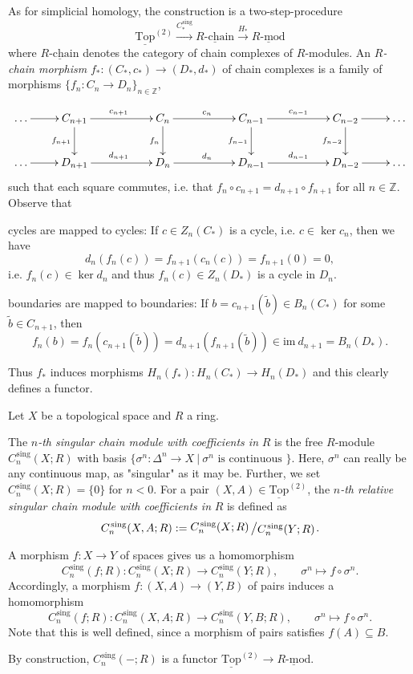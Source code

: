 \documentclass[11pt]{book}
\numberwithin{dummy}{section}
\theoremstyle{nonumberbreak}
\newenvironment{defin}[1][]{\ifthenelse{\equal{#1}{}}{\definition}{\definition[#1]}\rm}{\enddefinition}
\newcommand{\Rmod}{\underline{R\textrm{-}\mathrm{mod}}}
\newcommand{\toptwo}{\underline{\mathrm{Top}}^{(2)}}
\newcommand{\Rchain}{\underline{R\textrm{-}\mathrm{chain}}}
\newcommand{\la}{\longrightarrow}
\newcommand{\Z}{\mathbb{Z}}
\newcommand{\Cs}{C^{\hspace{1pt}\mathrm{sing}}}
\newcommand{\slant}[2]{{\raisebox{.1em}{$#1$}\left/\raisebox{-.1em}{$#2$}\right.}}
\begin{document}
\begin{spacing}{1.4}
\thispagestyle{empty}



As for simplicial homology, the construction is a two-step-procedure
$$\toptwo \xrightarrow{\Cs_{*}} \Rchain \overset{H_*}{\la} \Rmod$$
where $\Rchain$ denotes the category of chain complexes of $R$-modules. An $R$\textit{-chain morphism} \linebreak ${f_*: (C_*, c_*) \la (D_*, d_*)}$ of chain complexes is a family of morphisms $\{f_n: C_n \la D_n\}_{n \in \Z}$,

$$
\begin{xy}
\xymatrix{
\ldots \ar[r] & C_{n+1} \ar[d]_{f_{n+1}} \ar[rr]^{c_{n+1}} && C_n \ar[d]_{f_n} \ar[rr]^{c_n} && C_{n-1} \ar[d]_{f_{n-1}} \ar[rr]^{c_{n-1}} && C_{n-2} \ar[d]_{f_{n-2}} \ar[r] & \ldots \\
\ldots \ar[r] & D_{n+1} \ar[rr]^{d_{n+1}} && D_n \ar[rr]^{d_n} && D_{n-1} \ar[rr]^{d_{n-1}} && D_{n-2} \ar[r] & \ldots
}
\end{xy}
$$
such that each square commutes, i.e. that $f_n \circ c_{n+1} = d_{n+1} \circ f_{n+1}$ for all $n \in \Z$. Observe that
\begin{compactenum}
\item cycles are mapped to cycles: If $c \in Z_n(C_*)$ is a cycle, i.e. $c \in \ker c_n$, then we have
$$d_n(f_n(c)) = f_{n+1}(c_n(c)) = f_{n+1}(0) = 0,$$
i.e. $f_n(c) \in \ker d_n$ and thus $f_n(c) \in Z_n(D_*)$ is a cycle in $D_n$.
\item boundaries are mapped to boundaries: If $b= c_{n+1}(\tilde{b}) \in B_n(C_*)$ for some $\tilde{b} \in C_{n+1}$, then 
$$f_n(b) = f_n(c_{n+1}(\tilde{b})) = d_{n+1}(f_{n+1}(\tilde{b})) \in \mathrm{im} \ d_{n+1} = B_n(D_*).$$
\end{compactenum}
Thus $f_*$ induces morphisms $H_n(f_*): H_n(C_*) \la H_n(D_*)$ and this clearly defines a functor.

\begin{defin}
Let $X$ be a topological space and $R$ a ring.
\begin{compactenum}
\item The $n$\textit{-th singular chain module with coefficients in} $R$ is the free $R$-module $\Cs_n(X;R)$ with basis $\{ \sigma^n: \Delta^n \la X \ \vert \ \sigma^n \textrm{ is continuous } \}$. Here, $\sigma^n$ can really be any continuous map, as "singular" as it may be. Further, we set $\Cs_n(X;R) = \{0\}$ for $n <0$.
For a pair $(X,A) \in \toptwo$, the $n$\textit{-th relative singular chain module with coefficients in} $R$ is defined as 
$$\Cs_n(X,A;R) := \slant{\Cs_n(X;R)}{\Cs_n(Y;R)}.$$
\item A morphism $f: X \la Y$ of spaces gives us a homomorphism
$$\Cs_n(f;R): \Cs_n(X;R) \la \Cs_n(Y;R), \qquad \sigma^n \mapsto f \circ \sigma^n.$$
Accordingly, a morphism $f: (X,A) \la (Y,B)$ of pairs induces a homomorphism
$$\Cs_n(f;R) : \Cs_n(X,A;R) \la \Cs_n(Y,B;R), \qquad \sigma^n \mapsto f \circ \sigma^n.$$
Note that this is well defined, since a morphism of pairs satisfies $f(A) \subseteq B$.
\item By construction, $\Cs_n(-;R)$ is a functor $\toptwo \la \Rmod$.


\end{compactenum}
\end{defin}
\end{spacing}
\end{document}
